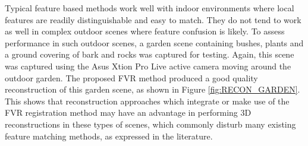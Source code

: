 Typical feature based methods work well with indoor environments where local features are readily distinguishable and easy to match. They do not tend to work as well in complex outdoor scenes where feature confusion is likely. To assess performance in such outdoor scenes, a garden scene containing bushes, plants and a ground covering of bark and rocks was captured for testing. Again, this scene was captured using the Asus Xtion Pro Live active camera moving around the outdoor garden. The proposed FVR method produced a good quality reconstruction of this garden scene, as shown in Figure \ref{fig:RECON_GARDEN}. This shows that reconstruction approaches which integrate or make use of the FVR registration method may have an advantage in performing 3D reconstructions in these types of scenes, which commonly disturb many existing feature matching methods, as expressed in the literature.   

